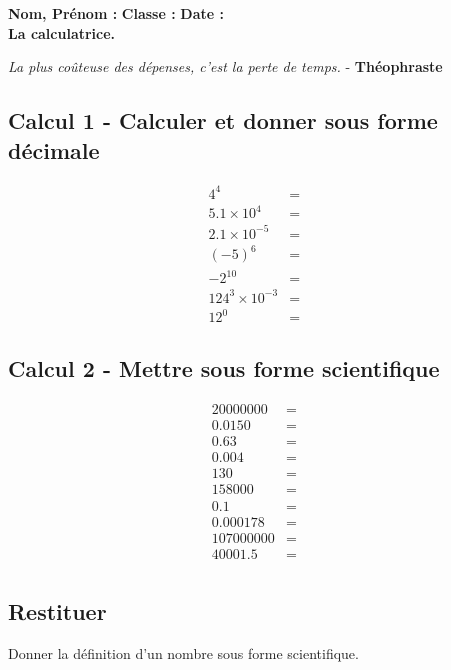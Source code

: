 \documentclass[10pt]{article}
\begin{document}

\textbf{Nom, Prénom :} \hspace{8cm} \textbf{Classe :} \hspace{3cm} \textbf{Date :}\\
\textbf{La calculatrice.}

\begin{center}
  \textit{La plus coûteuse des dépenses, c’est la perte de temps.}  - \textbf{Théophraste}
\end{center}

\subsection*{Calcul 1 - Calculer et donner sous forme décimale} 
\begin{eqnarray*}
	4^4                  &=& \\
	5.1 \times 10^4      &=& \\
	2.1 \times 10^{-5}   &=& \\
	(-5)^6               &=& \\
	-2^{10}                &=& \\
	124^3 \times 10^{-3} &=& \\
	12^0                 &=& 
\end{eqnarray*}
\subsection*{Calcul 2 - Mettre sous forme scientifique} 
\begin{eqnarray*}
	20 000 000  &=& \\
	0.0150      &=& \\
	0.63        &=& \\
	0.004       &=& \\
	130         &=& \\
	158 000     &=& \\
	0.1         &=& \\
	0.000 178   &=& \\
	107 000 000 &=& \\
	40 001.5    &=& \\
\end{eqnarray*}

\subsection*{Restituer}
Donner la définition d'un nombre sous forme scientifique. 
\end{document}
